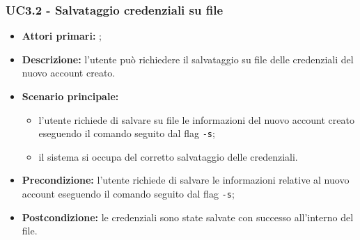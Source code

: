 \subsubsection{UC3.2 - Salvataggio credenziali su file}
\begin{itemize}
	\item \textbf{Attori primari:} \una{};
	\item \textbf{Descrizione:} l’utente può richiedere il salvataggio su file delle credenziali del nuovo account creato.
	\item \textbf{Scenario principale:}
	\begin{itemize}
		\item l’utente richiede di salvare su file le informazioni del nuovo account creato eseguendo il comando \signup{} seguito dal flag \texttt{-s}; 
		\item il sistema si occupa del corretto salvataggio delle credenziali. 
	\end{itemize}
	\item \textbf{Precondizione:} l’utente richiede di salvare le informazioni relative al nuovo account eseguendo il comando \signup{} seguito dal flag \texttt{-s};  
	\item \textbf{Postcondizione:} le credenziali sono state salvate con successo all’interno del file.
\end{itemize}
